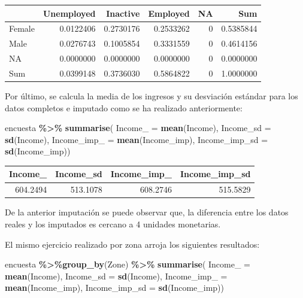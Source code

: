 \documentclass[
  12pt,
]{book}
\newenvironment{Shaded}{\begin{snugshade}}{\end{snugshade}}
\newcommand{\AttributeTok}[1]{\textcolor[rgb]{0.13,0.29,0.53}{#1}}
\newcommand{\FunctionTok}[1]{\textcolor[rgb]{0.13,0.29,0.53}{\textbf{#1}}}
\newcommand{\NormalTok}[1]{#1}
\newcommand{\SpecialCharTok}[1]{\textcolor[rgb]{0.81,0.36,0.00}{\textbf{#1}}}
\begin{document}
\begin{tabular}{l|r|r|r|r|r}
\hline
  & Unemployed & Inactive & Employed & NA & Sum\\
\hline
Female & 0.0122406 & 0.2730176 & 0.2533262 & 0 & 0.5385844\\
\hline
Male & 0.0276743 & 0.1005854 & 0.3331559 & 0 & 0.4614156\\
\hline
NA & 0.0000000 & 0.0000000 & 0.0000000 & 0 & 0.0000000\\
\hline
Sum & 0.0399148 & 0.3736030 & 0.5864822 & 0 & 1.0000000\\
\hline
\end{tabular}

Por último, se calcula la media de los ingresos y su desviación estándar para los datos completos e imputado como se ha realizado anteriormente:

\begin{Shaded}
\begin{Highlighting}[]
\NormalTok{encuesta }\SpecialCharTok{\%\textgreater{}\%} \FunctionTok{summarise}\NormalTok{(}
  \AttributeTok{Income\_ =} \FunctionTok{mean}\NormalTok{(Income),}
  \AttributeTok{Income\_sd =} \FunctionTok{sd}\NormalTok{(Income),}
  \AttributeTok{Income\_imp\_ =} \FunctionTok{mean}\NormalTok{(Income\_imp),}
  \AttributeTok{Income\_imp\_sd =} \FunctionTok{sd}\NormalTok{(Income\_imp))}
\end{Highlighting}
\end{Shaded}

\begin{tabular}{r|r|r|r}
\hline
Income\_ & Income\_sd & Income\_imp\_ & Income\_imp\_sd\\
\hline
604.2494 & 513.1078 & 608.2746 & 515.5829\\
\hline
\end{tabular}

De la anterior imputación se puede observar que, la diferencia entre los datos reales y los imputados es cercano a 4 unidades monetarias.

El mismo ejercicio realizado por zona arroja los siguientes resultados:

\begin{Shaded}
\begin{Highlighting}[]
\NormalTok{encuesta }\SpecialCharTok{\%\textgreater{}\%}\FunctionTok{group\_by}\NormalTok{(Zone) }\SpecialCharTok{\%\textgreater{}\%}  \FunctionTok{summarise}\NormalTok{(}
  \AttributeTok{Income\_ =} \FunctionTok{mean}\NormalTok{(Income),}
  \AttributeTok{Income\_sd =} \FunctionTok{sd}\NormalTok{(Income),}
  \AttributeTok{Income\_imp\_ =} \FunctionTok{mean}\NormalTok{(Income\_imp),}
  \AttributeTok{Income\_imp\_sd =} \FunctionTok{sd}\NormalTok{(Income\_imp))}
\end{Highlighting}
\end{Shaded}
\end{document}
